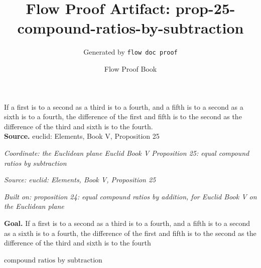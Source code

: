 \documentclass[11pt]{article}
\title{Flow Proof Artifact: prop-25-compound-ratios-by-subtraction}
\author{Generated by \texttt{flow doc proof}}
\date{Flow Proof Book}
\theoremstyle{definition}
\begin{document}
\maketitle
If a first is to a second as a third is to a fourth, and a fifth is to a second as a sixth is to a fourth, the difference of the first and fifth is to the second as the difference of the third and sixth is to the fourth.\\[0.5em]
\textbf{Source.} euclid: Elements, Book V, Proposition 25\\[0.5em]
\bigskip
{}\par
\smallskip\noindent\textit{Coordinate: the Euclidean plane \cdot Euclid Book V \cdot Proposition 25: equal compound ratios by subtraction}\par
\smallskip\noindent\textit{Source: euclid: Elements, Book V, Proposition 25}\par
\smallskip\noindent\textit{Built on: proposition 24: equal compound ratios by addition, for Euclid Book V on the Euclidean plane}\par
\medskip
\noindent\textbf{Goal.} If a first is to a second as a third is to a fourth, and a fifth is to a second as a sixth is to a fourth, the difference of the first and fifth is to the second as the difference of the third and sixth is to the fourth\par
\noindent$\displaystyle \text{compound ratios by subtraction}$\par
\medskip
\noindent
\end{document}
